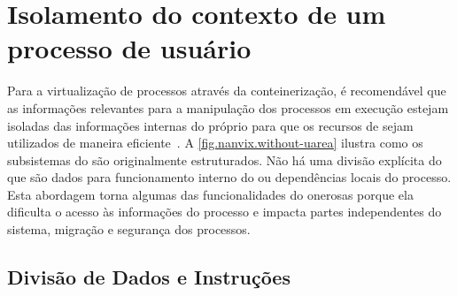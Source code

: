\section{Isolamento do contexto de um processo de usuário}
\label{sec.dev.kernel-usuario}

Para a virtualização de processos através da conteinerização, é recomendável que as informações relevantes para a manipulação dos processos em execução estejam isoladas das informações internas do próprio \os para que os recursos de \hardware sejam utilizados de maneira eficiente~\cite{live-vm-migration-techniques}.
A \autoref{fig.nanvix.without-uarea} ilustra como os subsistemas do \nanvix são originalmente estruturados. Não há uma divisão explícita do que são dados para funcionamento interno do \os ou dependências locais do processo.
Esta abordagem torna algumas das funcionalidades do \os onerosas porque ela dificulta o acesso às informações do processo e impacta partes independentes do sistema, \eg migração e segurança dos processos.

\subsection{Divisão de Dados e Instruções}
\label{sec.divisao-dados-instrucao}

